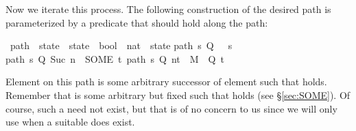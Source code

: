\begin{isabellebody}
\begin{isamarkuptext}
Now we iterate this process. The following construction of the desired
path is parameterized by a predicate  that should hold along the path:%
\end{isamarkuptext}%
\isamarkuptrue%
\ path\ {\isacharcolon}{\isacharcolon}\ {\isachardoublequote}state\ {\isasymRightarrow}\ {\isacharparenleft}state\ {\isasymRightarrow}\ bool{\isacharparenright}\ {\isasymRightarrow}\ {\isacharparenleft}nat\ {\isasymRightarrow}\ state{\isacharparenright}{\isachardoublequote}\isanewline
\isamarkupfalse%
\isanewline
{\isachardoublequote}path\ s\ Q\ {}\ {\isacharequal}\ s{\isachardoublequote}\isanewline
{\isachardoublequote}path\ s\ Q\ {\isacharparenleft}Suc\ n{\isacharparenright}\ {\isacharequal}\ {\isacharparenleft}SOME\ t{\isachardot}\ {\isacharparenleft}path\ s\ Q\ n{\isacharcomma}t{\isacharparenright}\ {\isasymin}\ M\ {\isasymand}\ Q\ t{\isacharparenright}{\isachardoublequote}\isamarkupfalse%
%
\begin{isamarkuptext}%
\noindent
Element  on this path is some arbitrary successor
 of element  such that  holds.  Remember that 
is some arbitrary but fixed  such that  holds (see \S\ref{sec:SOME}). Of
course, such a  need not exist, but that is of no
concern to us since we will only use  when a
suitable  does exist.


\end{isamarkuptext}
\end{isabellebody}
